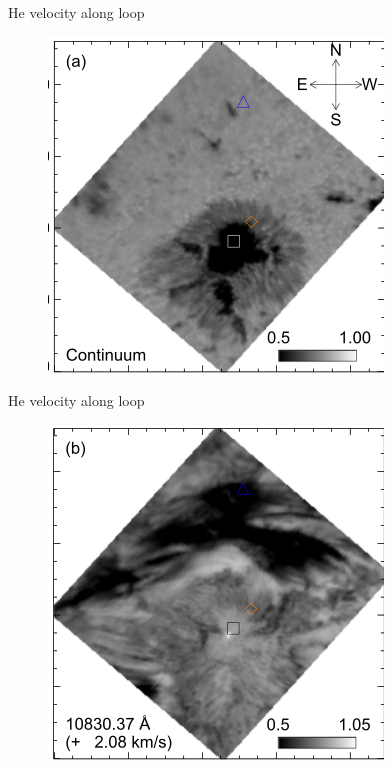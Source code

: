 \documentclass{beamer}
\begin{document}
\begin{frame}{He velocity along loop}

 
\begin{figure}[H]
 \centering
 \includegraphics[scale=0.6]{sp_cont.png}
\end{figure}



\end{frame}





\begin{frame}{He velocity along loop}
 
\begin{figure}[H]
 \centering
 \includegraphics[scale=0.6]{spb.png}
\end{figure}

\end{frame}
\end{document}
